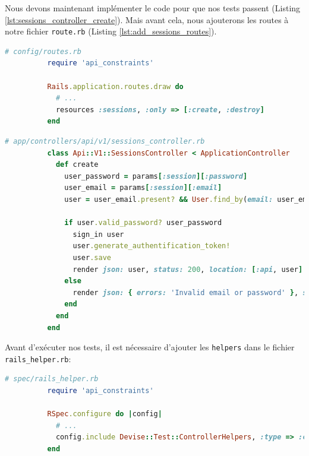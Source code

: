 \documentclass[]{report}
\begin{document}
        Nous devons maintenant implémenter le code pour que nos tests passent (Listing \ref{lst:sessions_controller_create}). Mais avant cela, nous ajouterons les routes à notre fichier \verb|route.rb| (Listing \ref{lst:add_sessions_routes}).

        \begin{scriptsize}
          \begin{lstlisting}[language=ruby, caption={Ajout des routes pour les sessions}, label={lst:add_sessions_routes}]
          # config/routes.rb
          require 'api_constraints'

          Rails.application.routes.draw do
            # ...
            resources :sessions, :only => [:create, :destroy]
          end
          \end{lstlisting}
        \end{scriptsize}

        \begin{scriptsize}
          \begin{lstlisting}[language=ruby, caption={Implémentation de la méthode SessionsController\#create}, label={lst:sessions_controller_create}]
          # app/controllers/api/v1/sessions_controller.rb
          class Api::V1::SessionsController < ApplicationController
            def create
              user_password = params[:session][:password]
              user_email = params[:session][:email]
              user = user_email.present? && User.find_by(email: user_email)

              if user.valid_password? user_password
                sign_in user
                user.generate_authentification_token!
                user.save
                render json: user, status: 200, location: [:api, user]
              else
                render json: { errors: 'Invalid email or password' }, status: 422
              end
            end
          end
          \end{lstlisting}
        \end{scriptsize}

        Avant d'exécuter nos tests, il est nécessaire d'ajouter les \verb|helpers| dans le fichier \verb|rails_helper.rb|:

        \begin{scriptsize}
          \begin{lstlisting}[language=ruby]
          # spec/rails_helper.rb
          require 'api_constraints'

          RSpec.configure do |config|
            # ...
            config.include Devise::Test::ControllerHelpers, :type => :controller
          end
          \end{lstlisting}
        \end{scriptsize}
\end{document}
